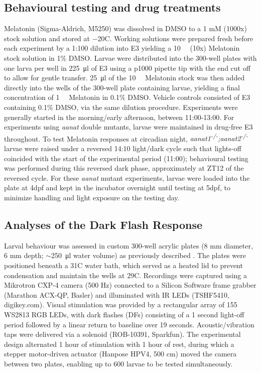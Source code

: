 \documentclass[9.5pt]{RandlettLab_elife}            %
\begin{document}
\subsection{Behavioural testing and drug treatments}
Melatonin (Sigma-Aldrich, M5250) was dissolved in DMSO to a 1 mM (1000x) stock solution and stored at $-$20\degree C.
Working solutions were prepared fresh before each experiment by a 1:100 dilution into E3 yielding a \SI{10}{\micro\Molar} (10x) Melatonin stock solution in 1\% DMSO. 
Larvae were distributed into the 300-well plates with one larva per well in \SI{225}{\micro\litre} of E3 using a p1000 pipette tip with the end cut off to allow for gentle transfer.
\SI{25}{\micro\litre} of the \SI{10}{\micro\Molar} Melatonin stock was then added directly into the wells of the 300-well plate containing larvae, yielding a final concentration of \SI{1}{\micro\Molar} Melatonin in 0.1\% DMSO. 
Vehicle controls consisted of E3 containing 0.1\% DMSO, via the same dilution procedure.
Experiments were generally started in the morning/early afternoon, between 11:00-13:00.
For experiments using \emph{aanat} double mutants, larvae were maintained in drug-free E3 throughout.
To test Melatonin responses at circadian night, \emph{aanat1\textsuperscript{-/-};aanat2\textsuperscript{-/-}} larvae were raised under a reversed 14:10 light/dark cycle such that lights-off coincided with the start of the experimental period (11:00); behavioural testing was performed during this reversed dark phase, approximately at ZT12 of the reversed cycle.
For these \emph{aanat} mutant experiments, larvae were loaded into the plate at 4dpf and kept in the incubator overnight until testing at 5dpf, to minimize handling and light exposure on the testing day. 


\subsection{Analyses of the Dark Flash Response}
Larval behaviour was assessed in custom 300-well acrylic plates (8 mm diameter, 6 mm depth; \(\sim\)\SI{250}{\micro\litre} water volume) as previously described \citep{Hsiao2025}.
The plates were positioned beneath a 31\degree C water bath, which served as a heated lid to prevent condensation and maintain the wells at 29\degree C.
Recordings were captured using a Mikrotron CXP-4 camera (500 Hz) connected to a Silicon Software frame grabber (Marathon ACX-QP, Basler) and illuminated with IR LEDs (TSHF5410, digikey.com).
Visual stimulation was provided by a rectangular array of 155 WS2813 RGB LEDs, with dark flashes (DFs) consisting of a 1 second light-off period followed by a linear return to baseline over 19 seconds.
Acoustic/vibration taps were delivered via a solenoid (ROB-10391, Sparkfun).
The experimental design alternated 1 hour of stimulation with 1 hour of rest, during which a stepper motor-driven actuator (Hanpose HPV4, 500 cm) moved the camera between two plates, enabling up to 600 larvae to be tested simultaneously.
\end{document}
